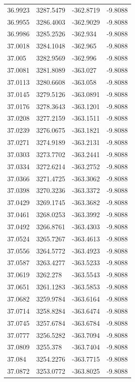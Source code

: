 \begin{table}[H]
\begin{tabular}{llll}
36.9923 & 3287.5479 & -362.8719 & -9.8088 \\
36.9955 & 3286.4003 & -362.9029 & -9.8088 \\
36.9986 & 3285.2526 & -362.934 & -9.8088 \\
37.0018 & 3284.1048 & -362.965 & -9.8088 \\
37.005 & 3282.9569 & -362.996 & -9.8088 \\
37.0081 & 3281.8089 & -363.027 & -9.8088 \\
37.0113 & 3280.6608 & -363.058 & -9.8088 \\
37.0145 & 3279.5126 & -363.0891 & -9.8088 \\
37.0176 & 3278.3643 & -363.1201 & -9.8088 \\
37.0208 & 3277.2159 & -363.1511 & -9.8088 \\
37.0239 & 3276.0675 & -363.1821 & -9.8088 \\
37.0271 & 3274.9189 & -363.2131 & -9.8088 \\
37.0303 & 3273.7702 & -363.2441 & -9.8088 \\
37.0334 & 3272.6214 & -363.2752 & -9.8088 \\
37.0366 & 3271.4725 & -363.3062 & -9.8088 \\
37.0398 & 3270.3236 & -363.3372 & -9.8088 \\
37.0429 & 3269.1745 & -363.3682 & -9.8088 \\
37.0461 & 3268.0253 & -363.3992 & -9.8088 \\
37.0492 & 3266.8761 & -363.4303 & -9.8088 \\
37.0524 & 3265.7267 & -363.4613 & -9.8088 \\
37.0556 & 3264.5772 & -363.4923 & -9.8088 \\
37.0587 & 3263.4277 & -363.5233 & -9.8088 \\
37.0619 & 3262.278 & -363.5543 & -9.8088 \\
37.0651 & 3261.1283 & -363.5853 & -9.8088 \\
37.0682 & 3259.9784 & -363.6164 & -9.8088 \\
37.0714 & 3258.8284 & -363.6474 & -9.8088 \\
37.0745 & 3257.6784 & -363.6784 & -9.8088 \\
37.0777 & 3256.5282 & -363.7094 & -9.8088 \\
37.0809 & 3255.378 & -363.7404 & -9.8088 \\
37.084 & 3254.2276 & -363.7715 & -9.8088 \\
37.0872 & 3253.0772 & -363.8025 & -9.8088 \\

\end{tabular}
\end{table}
